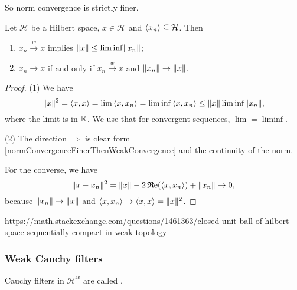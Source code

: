 So norm convergence is strictly finer.

\begin{proposition}
Let $\mathcal{H}$ be a Hilbert space, $x\in \mathcal{H}$ and $\left\langle x_n \right\rangle\subseteq \mathcal{H}$. Then
\begin{enumerate}
\item $x_n \overset{w}{\longrightarrow} x$ implies $\lVert x\rVert \leq \liminf \lVert x_n\rVert$;
\item $x_n \longrightarrow x$ \textup{if and only if} $x_n \overset{w}{\longrightarrow} x$ and $\lVert x_n\rVert\to \lVert x\rVert$.
\end{enumerate}
\end{proposition}
\begin{proof}
(1) We have
\[ \lVert x\rVert^2 = \left\langle x,x \right\rangle = \lim \left\langle x,x_n \right\rangle = \liminf\left\langle x,x_n \right\rangle \leq \lVert x\rVert\liminf\lVert x_n\rVert, \]
where the limit is in $\mathbb{R}$. We use that for convergent sequences, $\lim = \liminf$.

(2) The direction $\Rightarrow$ is clear form \ref{normConvergenceFinerThenWeakConvergence} and the continuity of the norm.

For the converse, we have
\[ \lVert x-x_n\rVert^2 = \lVert x\rVert-2\operatorname{\mathfrak{R}e}(\left\langle x,x_n \right\rangle) + \lVert x_n\rVert \to 0, \]
because $\lVert x_n\rVert \to \lVert x\rVert$ and $\left\langle x,x_n \right\rangle \to \left\langle x,x \right\rangle = \lVert x\rVert^2$.
\end{proof}

\url{https://math.stackexchange.com/questions/1461363/closed-unit-ball-of-hilbert-space-sequentially-compact-in-weak-topology}

\subsubsection{Weak Cauchy filters}
\begin{definition}
Cauchy filters in $\mathcal{H}^w$ are called .
\end{definition}


